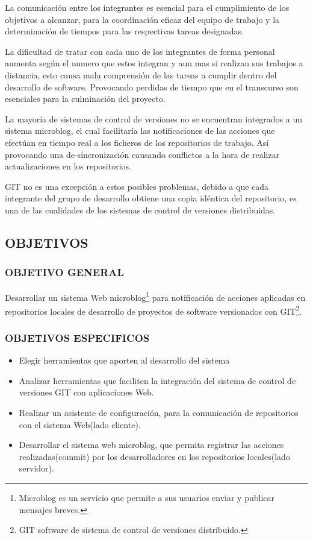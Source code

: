 La comunicación entre los integrantes es esencial para el cumplimiento de los objetivos a alcanzar, para la coordinación eficaz del equipo de trabajo y la determinación de tiempos para las respectivas tareas designadas.

La dificultad de tratar con cada uno de los integrantes de forma personal aumenta según el numero que estos integran y aun mas si realizan sus trabajos a distancia, esto causa mala comprensión de las tareas a cumplir dentro del desarrollo de software. Provocando perdidas de tiempo que en el transcurso son esenciales para la culminación del proyecto.

La mayoría de sistemas de control de versiones no se encuentran integrados a un sistema microblog, el cual facilitaría las notificaciones de las acciones que efectúan en tiempo real a los ficheros de los repositorios de trabajo. Así provocando una de-sincronización causando conflictos a la hora de realizar actualizaciones en los repositorios.

GIT no es una excepción a estos posibles problemas, debido a que cada integrante del grupo de desarrollo obtiene una copia idéntica del repositorio, es una de las cualidades de los sistemas de control de versiones distribuidas.
\subsection{OBJETIVOS}
\subsubsection{OBJETIVO GENERAL}
Desarrollar un sistema Web microblog\footnote{Microblog es un servicio que permite a sus usuarios enviar y publicar mensajes breves.
} para notificación de acciones aplicadas en repositorios locales de desarrollo de proyectos de software versionados con GIT\footnote{GIT software de sistema de control de versiones distribuido.
}.

\subsubsection{OBJETIVOS ESPECIFICOS}
\begin{itemize}
\item Elegir herramientas que aporten al desarrollo del sistema
\item Analizar herramientas que faciliten la integración del sistema de control 	de versiones GIT con aplicaciones Web.
\item Realizar un asistente de configuración, para la comunicación de 	repositorios con el sistema Web(lado cliente).
\item Desarrollar el sistema web microblog, que permita registrar las acciones realizadas(commit) por los desarrolladores en los repositorios locales(lado servidor).
\end{itemize}

